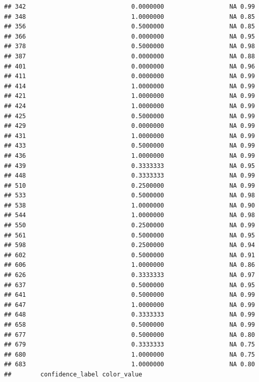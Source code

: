 \documentclass[
]{article}
\begin{document}
\begin{verbatim}
## 342                             0.0000000                  NA 0.99
## 348                             1.0000000                  NA 0.85
## 356                             0.5000000                  NA 0.85
## 366                             0.0000000                  NA 0.95
## 378                             0.5000000                  NA 0.98
## 387                             0.0000000                  NA 0.88
## 401                             0.0000000                  NA 0.96
## 411                             0.0000000                  NA 0.99
## 414                             1.0000000                  NA 0.99
## 421                             1.0000000                  NA 0.99
## 424                             1.0000000                  NA 0.99
## 425                             0.5000000                  NA 0.99
## 429                             0.0000000                  NA 0.99
## 431                             1.0000000                  NA 0.99
## 433                             0.5000000                  NA 0.99
## 436                             1.0000000                  NA 0.99
## 439                             0.3333333                  NA 0.95
## 448                             0.3333333                  NA 0.99
## 510                             0.2500000                  NA 0.99
## 533                             0.5000000                  NA 0.98
## 538                             1.0000000                  NA 0.90
## 544                             1.0000000                  NA 0.98
## 550                             0.2500000                  NA 0.99
## 561                             0.5000000                  NA 0.95
## 598                             0.2500000                  NA 0.94
## 602                             0.5000000                  NA 0.91
## 606                             1.0000000                  NA 0.86
## 626                             0.3333333                  NA 0.97
## 637                             0.5000000                  NA 0.95
## 641                             0.5000000                  NA 0.99
## 647                             1.0000000                  NA 0.99
## 648                             0.3333333                  NA 0.99
## 658                             0.5000000                  NA 0.99
## 677                             0.5000000                  NA 0.80
## 679                             0.3333333                  NA 0.75
## 680                             1.0000000                  NA 0.75
## 683                             1.0000000                  NA 0.80
##        confidence_label color_value

\end{verbatim}
\end{document}
